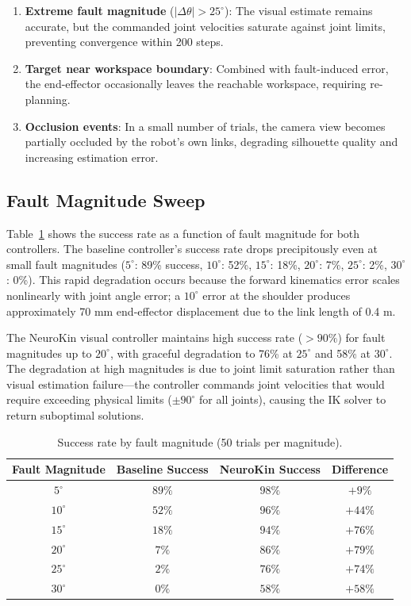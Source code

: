 \documentclass[12pt,a4paper,oneside]{report}
\begin{document}
\begin{enumerate}
    \item \textbf{Extreme fault magnitude} ($|\Delta \theta| > 25^\circ$): The visual estimate remains accurate, but the commanded joint velocities saturate against joint limits, preventing convergence within 200 steps.
    \item \textbf{Target near workspace boundary}: Combined with fault-induced error, the end-effector occasionally leaves the reachable workspace, requiring re-planning.
    \item \textbf{Occlusion events}: In a small number of trials, the camera view becomes partially occluded by the robot's own links, degrading silhouette quality and increasing estimation error.
\end{enumerate}

\subsection{Fault Magnitude Sweep}

Table~\ref{tab:fault_sweep} shows the success rate as a function of fault magnitude for both controllers. The baseline controller's success rate drops precipitously even at small fault magnitudes ($5^\circ$: 89\% success, $10^\circ$: 52\%, $15^\circ$: 18\%, $20^\circ$: 7\%, $25^\circ$: 2\%, $30^\circ$: 0\%). This rapid degradation occurs because the forward kinematics error scales nonlinearly with joint angle error; a $10^\circ$ error at the shoulder produces approximately 70 mm end-effector displacement due to the link length of 0.4 m.

The NeuroKin visual controller maintains high success rate ($>90\%$) for fault magnitudes up to $20^\circ$, with graceful degradation to 76\% at $25^\circ$ and 58\% at $30^\circ$. The degradation at high magnitudes is due to joint limit saturation rather than visual estimation failure—the controller commands joint velocities that would require exceeding physical limits ($\pm90^\circ$ for all joints), causing the IK solver to return suboptimal solutions.

\begin{table}[H]
\centering
\caption{Success rate by fault magnitude (50 trials per magnitude).}
\label{tab:fault_sweep}
\begin{tabular}{cccc}
\toprule
\textbf{Fault Magnitude} & \textbf{Baseline Success} & \textbf{NeuroKin Success} & \textbf{Difference} \\
\midrule
$5^\circ$ & $89\%$ & $98\%$ & $+9\%$ \\
$10^\circ$ & $52\%$ & $96\%$ & $+44\%$ \\
$15^\circ$ & $18\%$ & $94\%$ & $+76\%$ \\
$20^\circ$ & $7\%$ & $86\%$ & $+79\%$ \\
$25^\circ$ & $2\%$ & $76\%$ & $+74\%$ \\
$30^\circ$ & $0\%$ & $58\%$ & $+58\%$ \\
\bottomrule
\end{tabular}
\end{table}
\end{document}

